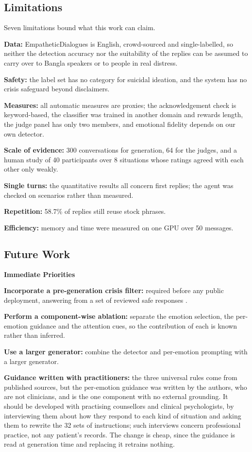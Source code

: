 \subsection{Limitations}
\label{sec:5.6.5}

Seven limitations bound what this work can claim.

\textbf{Data:} EmpatheticDialogues is English, crowd-sourced and single-labelled, so neither the detection accuracy nor the suitability of the replies can be assumed to carry over to Bangla speakers or to people in real distress.

\textbf{Safety:} the label set has no category for suicidal ideation, and the system has no crisis safeguard beyond disclaimers.

\textbf{Measures:} all automatic measures are proxies; the acknowledgement check is keyword-based, the classifier was trained in another domain and rewards length, the judge panel has only two members, and emotional fidelity depends on our own detector.

\textbf{Scale of evidence:} 300 conversations for generation, 64 for the judges, and a human study of 40 participants over 8 situations whose ratings agreed with each other only weakly.

\textbf{Single turns:} the quantitative results all concern first replies; the agent was checked on scenarios rather than measured.

\textbf{Repetition:} 58.7\% of replies still reuse stock phrases.

\textbf{Efficiency:} memory and time were measured on one GPU over 50 messages.

\subsection{Future Work}
\label{sec:5.6.6}

\textbf{Immediate Priorities}

\textbf{Incorporate a pre-generation crisis filter:} required before any public deployment, answering from a set of reviewed safe responses \cite{who2023suicide}.

\textbf{Perform a component-wise ablation:} separate the emotion selection, the per-emotion guidance and the attention cues, so the contribution of each is known rather than inferred.

\textbf{Use a larger generator:} combine the detector and per-emotion prompting with a larger generator.

\textbf{Guidance written with practitioners:} the three universal rules come from published sources, but the per-emotion guidance was written by the authors, who are not clinicians, and is the one component with no external grounding. It should be developed with practising counsellors and clinical psychologists, by interviewing them about how they respond to each kind of situation and asking them to rewrite the 32 sets of instructions; such interviews concern professional practice, not any patient's records. The change is cheap, since the guidance is read at generation time and replacing it retrains nothing.

